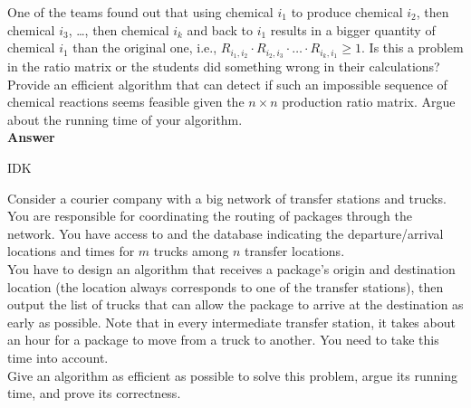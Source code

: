 \documentclass{article}
\begin{document}
\vspace{0.1in}

 One of the teams found out that using chemical
$i_1$ to produce chemical $i_2$, then chemical $i_3$, \dots, then
chemical $i_k$ and back to $i_1$ results in a bigger quantity of
chemical $i_1$ than the original one, i.e., $R_{i_1,i_2} \cdot
R_{i_2,i_3} \cdot \ldots \cdot R_{i_k,i_1} \geq 1$. Is this a problem
in the ratio matrix or the students did something wrong in their
calculations? Provide an efficient algorithm that can detect if such
an impossible sequence of chemical reactions seems feasible given the
$n \times n$ production ratio matrix. Argue about the running time of
your algorithm.\\

\textbf{ Answer }
\vspace{0.1in}
\begin{adjustwidth}{1.8em}{0pt}
IDK
\end{adjustwidth}

\vspace{0.1in}

 Consider a courier company with
a big network of transfer stations and trucks. You are responsible for
coordinating the routing of packages through the network. You have
access to and the database indicating the departure/arrival locations
and times for $m$ trucks among $n$ transfer locations.\\

\noindent You have to design an algorithm that receives a package's
origin and destination location (the location always corresponds to
one of the transfer stations), then output the list of trucks that can
allow the package to arrive at the destination as early as
possible. Note that in every intermediate transfer station, it takes
about an hour for a package to move from a truck to another. You need
to take this time into account.\\

\noindent Give an algorithm as efficient as possible to solve this
problem, argue its running time, and prove its correctness.\\
\end{document}
